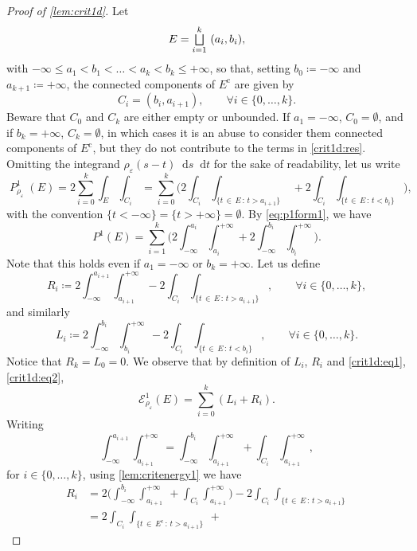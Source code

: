\documentclass[JEP,XML,SOM,Unicode,published]{cedram}
\let\oldbigsqcup\bigsqcup
\renewcommand{\bigsqcup}{\mathop{\textstyle\oldbigsqcup}\displaylimits}
\newcommand{\sep}{\,:\,}
\numberwithin{equation}{section}
\theoremstyle{plain}
\theoremstyle{definition}
\newcommand{\dt}{\mathop{}\mathopen{}\mathrm{d}t}
\newcommand{\ds}{\mathop{}\mathopen{}\mathrm{d}s}
\newcommand{\calE}{{\mathcal{E}}}
\let\eps\varepsilon
\newcommand{\compl}{{\mathrm{c}}}
\DeclareMathOperator{\Per}{\mathit{P}}
\begin{document}
\begin{proof}[Proof of {\cref{lem:crit1d}}]
Let
\[
E=\bigsqcup_{i=1}^k~ (a_i,b_i),
\]
with $-\infty\leq a_1<b_1<\ldots<a_k<b_k\leq +\infty$, so that, setting $b_0\coloneqq-\infty$ and
$a_{k+1}\coloneqq+\infty$, the connected components of $E^\compl$ are given by
\[
C_i=(b_i,a_{i+1}),\qquad\forall i\in \{0,\dotsc,k\}.
\]
Beware that $C_0$ and $C_k$ are either empty or unbounded. If $a_1=-\infty$, $C_0=\emptyset$, and if
$b_k=+\infty$, $C_k=\emptyset$, in which cases it is an abuse to consider them connected components
of $E^\compl$, but they do not contribute to the terms in \cref{crit1d:res}.
Omitting the integrand $\rho_\eps(s-t)\ds\dt$ for the sake of readability, let us write
\begin{equation}\label{crit1d:eq1}
\Per_{\rho_\eps}^1(E)
=2\sum_{i=0}^k \int_{E} \int_{C_i}
=\sum_{i=0}^k \biggl(2\int_{C_i} \int_{\{t\,\in\,E\sep t>a_{i+1}\}} ~
+ 2\int_{C_i} \int_{\{t\,\in\,E\sep t<b_i\}}\biggr),
\end{equation}
with the convention $\{t<-\infty\}=\{t>+\infty\}=\emptyset$.
By \cref{eq:p1form1}, we have
\begin{equation}\label{crit1d:eq2}
P^1(E)=\sum_{i=1}^k \biggl(2\int_{-\infty}^{a_i}
\int_{a_i}^{+\infty}+2\int_{-\infty}^{b_i}\int_{b_i}^{+\infty} \biggr).
\end{equation}
Note that this holds even if $a_1=-\infty$ or $b_k=+\infty$.
Let us define
\[
R_i\coloneqq 2\int_{-\infty}^{a_{i+1}} \int_{a_{i+1}}^{+\infty}~-2\int_{C_i}
\int_{\{t\,\in\,E\sep t>a_{i+1}\}},\qquad\forall i\in\{0,\dotsc,k\},
\]
and similarly
\[
L_i\coloneqq 2\int_{-\infty}^{b_i} \int_{b_i}^{+\infty}~-2\int_{C_i}
\int_{\{t\,\in\,E\sep t<b_i\}},\qquad\forall i\in\{0,\dotsc,k\}.
\]
Notice that $R_k=L_0=0$.
We observe that by definition of $L_i$, $R_i$ and \cref{crit1d:eq1}, \cref{crit1d:eq2},
\begin{equation}\label{crit1d:eq3}
\calE^1_{\rho_\eps}(E)
=\sum_{i=0}^{k}(L_i+R_i).
\end{equation}
Writing
\[
\int_{-\infty}^{a_{i+1}} \int_{a_{i+1}}^{+\infty}
= \int_{-\infty}^{b_i} \int_{a_{i+1}}^{+\infty}~
+\int_{C_i} \int_{a_{i+1}}^{+\infty},
\]
for $i\in\{0,\dotsc,k\}$, using \cref{lem:critenergy1} we have
\begin{equation}\label{crit1d:eq4}
\begin{aligned}
R_i
&=2 \biggl(\int_{-\infty}^{b_i}\int_{a_{i+1}}^{+\infty}~+
\int_{C_i}\int_{a_{i+1}}^{+\infty} \biggr) -2\int_{C_i}\int_{\{t\,\in\,E\sep t>a_{i+1}\}}\\
&=2\int_{C_i} \int_{\{t\,\in\, E^\compl\sep t>a_{i+1}\}}~ +

\end{aligned}
\end{equation}
\end{proof}
\end{document}
